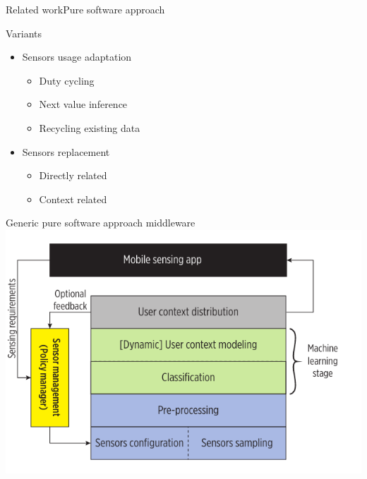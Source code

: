 \documentclass[9pt,xcolor={dvipsnames},handout]{beamer}
\begin{document}
\begin{frame}{Related work}{Pure software approach}
\begin{multicols}{2}
\begin{exampleblock}{Variants}
\begin{itemize}
  \item Sensors usage adaptation
    \begin{itemize}
      \item Duty cycling
      \item Next value inference
      \item Recycling existing data
    \end{itemize}
  \item Sensors replacement
  \begin{itemize}
    \item Directly related
    \item Context related
  \end{itemize}
\end{itemize}
\end{exampleblock}

\newpage
{\small Generic pure software approach middleware}
  {
  \centering
  \includegraphics[width=1.2\columnwidth]{vectors/generic-middleware-architecture-v2}
  }
\end{multicols}
\end{frame}
\end{document}
